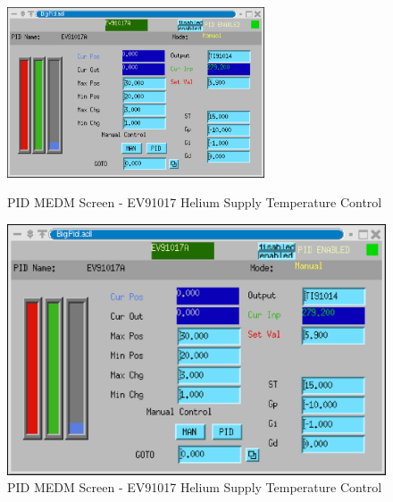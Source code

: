 \begin{figure}[h!]
\begin{latexonly}
\centering
\includegraphics[width=3in]{beamline/ev91017a.eps}
\caption{PID MEDM Screen - EV91017 Helium Supply Temperature Control}
\label{fig:ev17stc}
\end{latexonly}
\begin{htmlonly}
\includegraphics{beamline/ev91017a.eps}
\caption{PID MEDM Screen - EV91017 Helium Supply Temperature Control}
\label{fig:ev17stc}
\end{htmlonly}
\end{figure}




